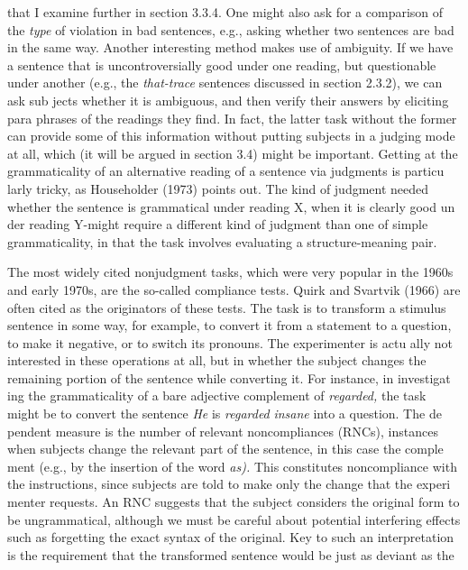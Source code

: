 \begin{styleTextbody}
that I examine further in section 3.3.4. One might also ask for a comparison of the \textit{type}\textit{ }of violation in bad sentences, e.g., asking whether two sentences are bad in the same way. Another interesting method makes use of ambiguity. If we have a sentence that is uncontroversially good under one reading, but questionable under another (e.g., the \textit{that-trace}\textit{ }sentences discussed in section 2.3.2), we can ask sub\- jects whether it is ambiguous, and then verify their answers by eliciting para\- phrases of the readings they find. In fact, the latter task without the former can provide some of this information without putting subjects in a judging mode at all, which (it will be argued in section 3.4) might be important. Getting at the grammaticality of an alternative reading of a sentence via judgments is particu\- larly tricky, as Householder (1973) points out. The kind of judgment needed\- whether the sentence is grammatical under reading X, when it is clearly good un\- der reading Y{}-might require a different kind of judgment than one of simple grammaticality, in that the task involves evaluating a structure-meaning pair.
\end{styleTextbody}


\begin{styleTextbody}
The most widely cited nonjudgment tasks, which were very popular in the 1960s and early 1970s, are the so-called compliance tests. Quirk and Svartvik (1966) are often cited as the originators of these tests. The task is to transform a stimulus sentence in some way, for example, to convert it from a statement to a question, to make it negative, or to switch its pronouns. The experimenter is actu\- ally not interested in these operations at all, but in whether the subject changes the remaining portion of the sentence while converting it. For instance, in investigat\- ing the grammaticality of a bare adjective complement of \textit{regarded,}\textit{ }the task might be to convert the sentence \textit{He}\textit{ }is \textit{regarded}\textit{ }\textit{insane}\textit{ }into a question. The de\- pendent measure is the number of relevant noncompliances (RNCs), instances when subjects change the relevant part of the sentence, in this case the comple\- ment (e.g., by the insertion of the word \textit{as).}\textit{ }This constitutes noncompliance with the instructions, since subjects are told to make only the change that the experi\- menter requests. An RNC suggests that the subject considers the original form to be ungrammatical, although we must be careful about potential interfering effects such as forgetting the exact syntax of the original. Key to such an interpretation is the requirement that the transformed sentence would be just as deviant as the
\end{styleTextbody}


